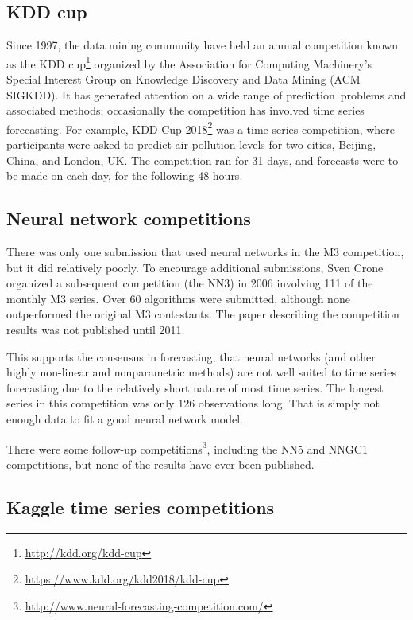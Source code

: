 \documentclass[11pt,a4paper,]{article}
\begin{document}
\hypertarget{kdd-cup}{%
\subsection*{KDD cup}\label{kdd-cup}}

Since 1997, the data mining community have held an annual competition known as the KDD cup\footnote{\url{http://kdd.org/kdd-cup}} organized by the Association for Computing Machinery's Special Interest Group on Knowledge Discovery and Data Mining (ACM SIGKDD). It has generated attention on a wide range of prediction~problems and associated methods; occasionally the competition has involved time series forecasting. For example, KDD Cup 2018\footnote{\url{https://www.kdd.org/kdd2018/kdd-cup}} was a time series competition, where participants were asked to predict air pollution levels for two cities, Beijing, China, and London, UK. The competition ran for 31 days, and forecasts were to be made on each day, for the following 48 hours.

\hypertarget{neural-network-competitions}{%
\subsection*{Neural network competitions}\label{neural-network-competitions}}

There was only one submission that used neural networks in the M3 competition, but it did relatively poorly. To encourage additional submissions, Sven Crone organized a subsequent competition (the NN3) in 2006 involving 111 of the monthly M3 series. Over 60 algorithms were submitted, although none outperformed the original M3 contestants. The paper describing the competition results \autocite{NN3} was not published until 2011.

This supports the consensus in forecasting, that neural networks (and other highly non-linear and nonparametric methods) are not well suited to time series forecasting due to the relatively short nature of most time series. The longest series in this competition was only 126 observations long. That is simply not enough data to fit a good neural network model.

There were some follow-up competitions\footnote{\url{http://www.neural-forecasting-competition.com/}}, including the NN5 and NNGC1 competitions, but none of the results have ever been published.

\hypertarget{kaggle-time-series-competitions}{%
\subsection*{Kaggle time series competitions}\label{kaggle-time-series-competitions}}
\end{document}
